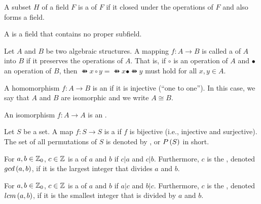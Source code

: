 \begin{defi}[Subfield]
A subset $H$ of a field $F$ is a  of $F$ if it closed under the operations of $F$ and also forms a field.
\cite{Oppliger:2011:CC:2049860}
\end{defi}

\begin{defi}
A  is a field that contains no proper subfield.
\cite{Oppliger:2011:CC:2049860}
\end{defi}

\begin{defi}[Homomorphism]
Let $A$ and $B$ be two algebraic structures. A mapping $f:A\rightarrow B$ is called a  of $A$ into $B$ if it preserves the operations of $A$. That is, if $\circ$ is an operation of $A$ and $\bullet$ an operation of $B$, then $\ffun{x\circ y}=\ffun{x}\bullet\ffun{y}$ must hold for all $x,y\in A$.
\cite{Oppliger:2011:CC:2049860}
\end{defi}

\begin{defi}[Isomorphism]
A homomorphism $f:A\rightarrow B$ is an  if it is injective (``one to one''). In this case, we say that $A$ and $B$ are isomorphic and we write $A\cong B$.
\cite{Oppliger:2011:CC:2049860}
\end{defi}

\begin{defi}[Automorphism]
An isomorphism $f:A\rightarrow A$ is an .
\cite{Oppliger:2011:CC:2049860}
\end{defi}

\begin{defi}[Permutation]
Let $S$ be a set. A map $f:S\rightarrow S$ is a  if $f$ is bijective (i.e., injective and surjective). The set of all permutations of $S$ is denoted by , or $P\left(S\right)$ in short.
\cite{Oppliger:2011:CC:2049860}
\end{defi}

\begin{defi}
For $a,b\in\mathbb{Z}_0$, $c\in\mathbb{Z}$ is a  of $a$ and $b$ if $c|a$ and $c|b$. Furthermore, $c$ is the , denoted $gcd\left(a,b\right)$, if it is the largest integer that divides $a$ and $b$.
\cite{Oppliger:2011:CC:2049860}
\end{defi}

\begin{defi}
For $a,b\in\mathbb{Z}_0$, $c\in\mathbb{Z}$ is a  of $a$ and $b$ if $a|c$ and $b|c$. Furthermore, $c$ is the , denoted $lcm\left(a,b\right)$, if it is the smallest integer that is divided by $a$ and $b$.
\cite{Oppliger:2011:CC:2049860}
\end{defi}

